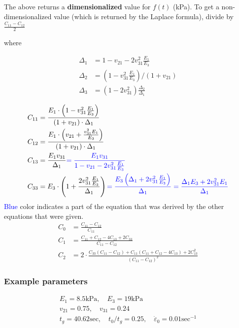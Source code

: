 \documentclass{article}
\begin{document}
The above returns a \textbf{dimensionalized} value for $f(t)$ (kPa). To get a non-dimensionalized value (which is returned by the Laplace formula), divide by $\frac{C_{11}-C_{12}}{2}$

where

\begin{align}
\Delta_{1}&=1-v_{21}-2 v_{31}^{2} \frac{E_{1}}{E_{3}} \\
\Delta_{2}&=\left(1-v_{31}^{2} \frac{E_{1}}{E_{3}}\right) /\left(1+v_{21}\right) \\
\Delta_{3}&=\left(1-2 v_{31}^{2}\right) \frac{\Delta_{2}}{\Delta_{1}} 
\end{align}

\begin{align}
C_{11}&=\frac{E_{1} \cdot\left(1-v_{31}^{2} \frac{E_{1}}{E_{3}}\right)}{\left(1+v_{21}\right) \cdot \Delta_{1}} \\
C_{12}&=\frac{E_{1} \cdot\left(v_{21}+\frac{v_{31}^{2} E_{1}}{E_{3}}\right)}{\left(1+v_{21}\right) \cdot \Delta_{1}} \\
C_{13}&=\frac{E_{1} v_{31}}{\Delta_{1}}\textcolor{blue}{=\frac{E_{1} v_{31}}{1-v_{21}-2 v_{31}^{2} \frac{E_{1}}{E_{3}}}} \\
C_{33}&=E_{3} \cdot\left(1+\frac{2 v_{31}^{2} \frac{E_{1}}{E_{3}}}{\Delta_{1}}\right) \textcolor{blue}{=\frac{E_{3}\left(\Delta_{1}+2 v_{31}^{2} \frac{E_{1}}{E_{3}}\right)}{\Delta_{1}}=\frac{\Delta_{1} E_{3}+2 v_{31}^{2} E_{1}}{\Delta_{1}}} \\
\end{align}
\textcolor{blue}{Blue} color indicates a part of the equation that was derived by the other equations that were given.
\begin{align}
C_{0}&=\frac{C_{11}-C_{12}}{C_{11}} \\
C_{1}&=\frac{C_{11}+C_{12}-4 C_{13}+2 C_{33}}{C_{11}-C_{12}} \\
C_{2}&=2 \cdot \frac{C_{33}\left(C_{11}-C_{12}\right)+C_{11}\left(C_{11}+C_{12}-4 C_{13}\right)+2 C_{13}^{2}}{\left(C_{11}-C_{12}\right)^{2}}
\end{align}

\subsubsection{Example parameters}
$$
\begin{gathered}
E_{1}=8.5 \mathrm{kPa}, \quad E_{3}=19 \mathrm{kPa} \\
v_{21}=0.75, \quad v_{31}=0.24 \\
t_{g}=40.62 \mathrm{sec}, \quad t_{0}/t_{g}=0.25, \quad \dot{\varepsilon}_{0}=0.01 \mathrm{sec}^{-1}
\end{gathered}
$$
\end{document}
